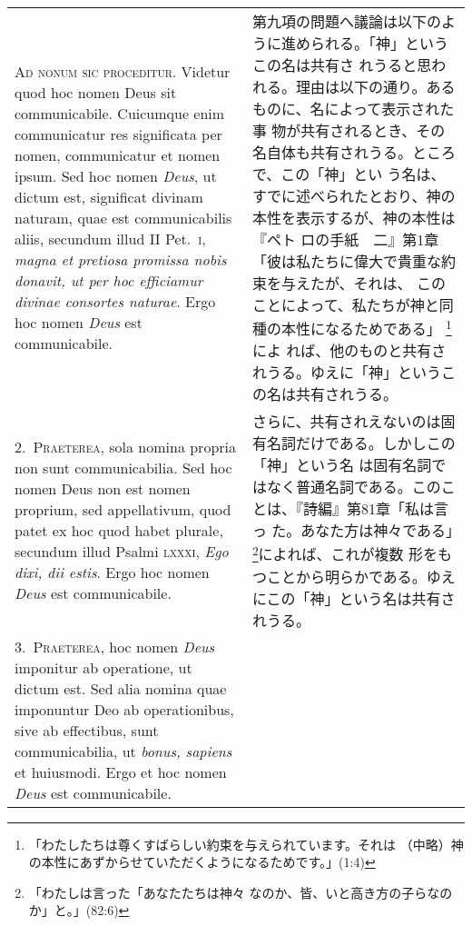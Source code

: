 \documentclass[10pt]{jsarticle}
\begin{document}
\begin{longtable}{p{21em}p{21em}}

{\huge A}{\scshape d nonum sic proceditur}. Videtur quod hoc nomen
Deus sit communicabile. Cuicumque enim communicatur res significata
per nomen, communicatur et nomen ipsum. Sed hoc nomen {\itshape Deus},
ut dictum est, significat divinam naturam, quae est communicabilis
aliis, secundum illud II Pet.~{\scshape i}, {\itshape magna et
pretiosa promissa nobis donavit, ut per hoc efficiamur divinae
consortes naturae}. Ergo hoc nomen {\itshape Deus} est communicabile.

&

第九項の問題へ議論は以下のように進められる。「神」というこの名は共有さ
れうると思われる。理由は以下の通り。あるものに、名によって表示された事
物が共有されるとき、その名自体も共有されうる。ところで、この「神」とい
う名は、すでに述べられたとおり、神の本性を表示するが、神の本性は『ペト
ロの手紙　二』第1章「彼は私たちに偉大で貴重な約束を与えたが、それは、
このことによって、私たちが神と同種の本性になるためである」
\footnote{「わたしたちは尊くすばらしい約束を与えられています。それは
（中略）神の本性にあずからせていただくようになるためです。」(1:4)}によ
れば、他のものと共有されうる。ゆえに「神」というこの名は共有されうる。

\\

2.~{\scshape Praeterea}, sola nomina propria non sunt
communicabilia. Sed hoc nomen Deus non est nomen proprium, sed
appellativum, quod patet ex hoc quod habet plurale, secundum illud
Psalmi {\scshape lxxxi}, {\itshape Ego dixi, dii estis}. Ergo hoc
nomen {\itshape Deus} est communicabile.

&

さらに、共有されえないのは固有名詞だけである。しかしこの「神」という名
は固有名詞ではなく普通名詞である。このことは、『詩編』第81章「私は言っ
た。あなた方は神々である」\footnote{「わたしは言った「あなたたちは神々
なのか、皆、いと高き方の子らなのか」と。」(82:6)}によれば、これが複数
形をもつことから明らかである。ゆえにこの「神」という名は共有されうる。

\\

3.~{\scshape Praeterea}, hoc nomen {\itshape Deus} imponitur ab
operatione, ut dictum est. Sed alia nomina quae imponuntur Deo ab
operationibus, sive ab effectibus, sunt communicabilia, ut {\itshape
bonus, sapiens} et huiusmodi. Ergo et hoc nomen {\itshape Deus} est
communicabile.

&


\end{longtable}
\end{document}
